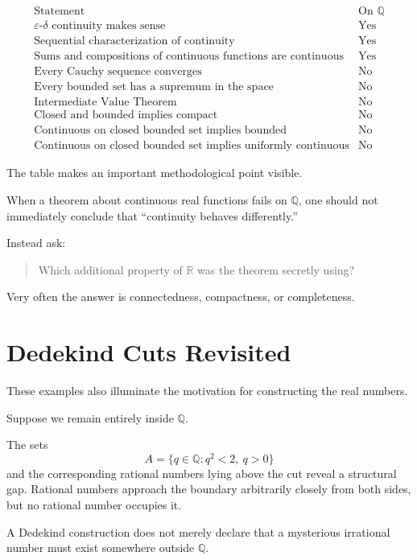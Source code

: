 \documentclass{essay}
\begin{document}
\[
\begin{array}{c|c}
\text{Statement} & \text{On }\mathbb{Q} \\ \hline
\varepsilon\text{-}\delta\text{ continuity makes sense}
& \text{Yes}\\
\text{Sequential characterization of continuity}
& \text{Yes}\\
\text{Sums and compositions of continuous functions are continuous}
& \text{Yes}\\
\text{Every Cauchy sequence converges}
& \text{No}\\
\text{Every bounded set has a supremum in the space}
& \text{No}\\
\text{Intermediate Value Theorem}
& \text{No}\\
\text{Closed and bounded implies compact}
& \text{No}\\
\text{Continuous on closed bounded set implies bounded}
& \text{No}\\
\text{Continuous on closed bounded set implies uniformly continuous}
& \text{No}
\end{array}
\]

The table makes an important methodological point visible.

When a theorem about continuous real functions fails on \(\mathbb{Q}\), one
should not immediately conclude that ``continuity behaves differently.''

Instead ask:

\begin{quote}
Which additional property of \(\mathbb{R}\) was the theorem secretly using?
\end{quote}

Very often the answer is connectedness, compactness, or completeness.

\section{Dedekind Cuts Revisited}

These examples also illuminate the motivation for constructing the real
numbers.

Suppose we remain entirely inside \(\mathbb{Q}\).

The sets
\[
A=\{q\in\mathbb{Q}:q^2<2,\ q>0\}
\]
and the corresponding rational numbers lying above the cut reveal a structural
gap. Rational numbers approach the boundary arbitrarily closely from both
sides, but no rational number occupies it.

A Dedekind construction does not merely declare that a mysterious irrational
number must exist somewhere outside \(\mathbb{Q}\).
\end{document}
